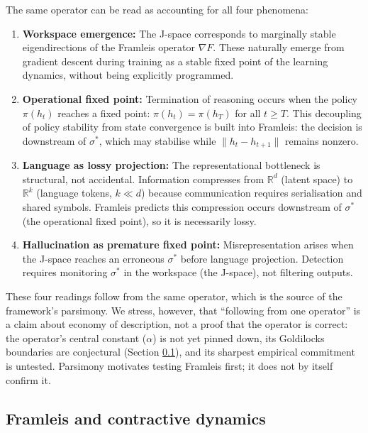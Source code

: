\documentclass[11pt,a4paper]{article}
\theoremstyle{definition}
\begin{document}
The same operator can be read as accounting for all four phenomena:

\begin{enumerate}
    \item \textbf{Workspace emergence:} The J-space corresponds to marginally stable
    eigendirections of the Framleis operator $\nabla F$. These naturally emerge from
    gradient descent during training as a stable fixed point of the learning dynamics,
    without being explicitly programmed.

    \item \textbf{Operational fixed point:} Termination of reasoning occurs when the
    policy $\pi(h_t)$ reaches a fixed point: $\pi(h_t) = \pi(h_T)$ for all $t \geq T$.
    This decoupling of policy stability from state convergence is built into Framleis:
    the decision is downstream of $\sigma^*$, which may stabilise while $\|h_t - h_{t+1}\|$
    remains nonzero.

    \item \textbf{Language as lossy projection:} The representational bottleneck is
    structural, not accidental. Information compresses from $\mathbb{R}^d$ (latent space)
    to $\mathbb{R}^k$ (language tokens, $k \ll d$) because communication requires
    serialisation and shared symbols. Framleis predicts this compression occurs
    downstream of $\sigma^*$ (the operational fixed point), so it is necessarily
    lossy.

    \item \textbf{Hallucination as premature fixed point:} Misrepresentation arises
    when the J-space reaches an erroneous $\sigma^*$ before language projection.
    Detection requires monitoring $\sigma^*$ in the workspace (the J-space), not
    filtering outputs.
\end{enumerate}

These four readings follow from the same operator, which is the source of the
framework's parsimony. We stress, however, that ``following from one operator'' is
a claim about economy of description, not a proof that the operator is correct: the
operator's central constant ($\alpha$) is not yet pinned down, its Goldilocks
boundaries are conjectural (Section \ref{sec:framleis-contractive}), and its sharpest
empirical commitment is untested. Parsimony motivates testing Framleis first; it does
not by itself confirm it.

\subsection{Framleis and contractive dynamics}
\label{sec:framleis-contractive}
\end{document}
